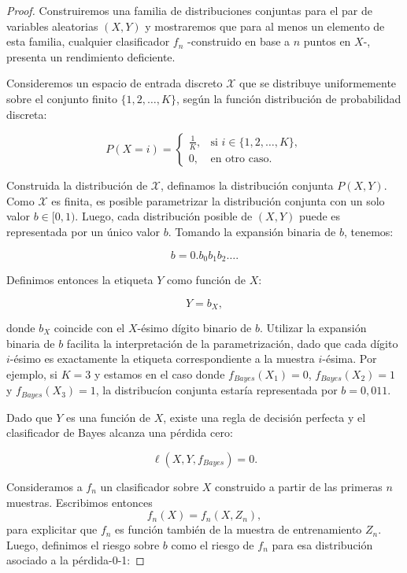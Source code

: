 \documentclass{report}
\begin{document}
\begin{proof}

Construiremos una familia de distribuciones conjuntas para el par de variables aleatorias \((X, Y)\) y mostraremos que para al menos un 
elemento de esta familia, cualquier clasificador \(f_n\) -construido en base a $n$ puntos en $X$-, presenta un rendimiento deficiente.\newline

Consideremos un espacio de entrada 
discreto \(\mathcal{X}\) que se distribuye uniformemente sobre el conjunto finito \(\{1, 2, \dots, K\}\), 
según la función distribución de probabilidad discreta:

\[
P(X = i) = \begin{cases} 
\frac{1}{K}, & \text{si } i \in \{1, 2, \dots, K\}, \\ 
0, & \text{en otro caso}.
\end{cases}
\]


Construida la distribución de \(\mathcal{X}\), definamos la distribución conjunta \(P(X,Y)\). Como \(\mathcal{X}\) es finita,
es posible parametrizar la distribución conjunta con un solo valor
\(b \in [0,1)\). Luego, cada distribución posible de $(X,Y)$ puede es representada por un único valor \(b\).
Tomando la expansión binaria de $b$, tenemos:

\[
b = 0.b_0 b_1 b_2 \dots.
\]

Definimos entonces la etiqueta \(Y\) como función de \(X\):

\[
Y = b_X,
\]

donde \(b_X\) coincide con el \(X\)-ésimo dígito binario de \(b\). Utilizar la expansión binaria de $b$ facilita la interpretación
de la parametrización, dado que cada dígito $i$-ésimo es exactamente la etiqueta correspondiente a la muestra $i$-ésima.
Por ejemplo, si \(K=3\) y estamos en el caso donde  \(f_{Bayes}(X_1)=0\),  \(f_{Bayes}(X_2)=1\) y \(f_{Bayes}(X_3)=1\), 
la distribucíon conjunta estaría representada por $b=0,011$.\newline


Dado que \(Y\) es una función de \(X\), existe una regla de decisión perfecta y el clasificador de Bayes alcanza una pérdida cero:

\[
\ell(X,Y,f_{Bayes}) = 0.
\]

Consideramos a $f_n$ un clasificador sobre $X$ construido a partir de las primeras $n$ muestras. Escribimos entonces
\[
f_n(X) = f_n(X, Z_n),
\]
para explicitar que $f_n$ es función también de la muestra de entrenamiento $Z_n$. Luego, definimos el riesgo sobre \(b\)
como el riesgo de $f_n$ para esa distribución asociado a la pérdida-0-1:



\end{proof}
\end{document}
